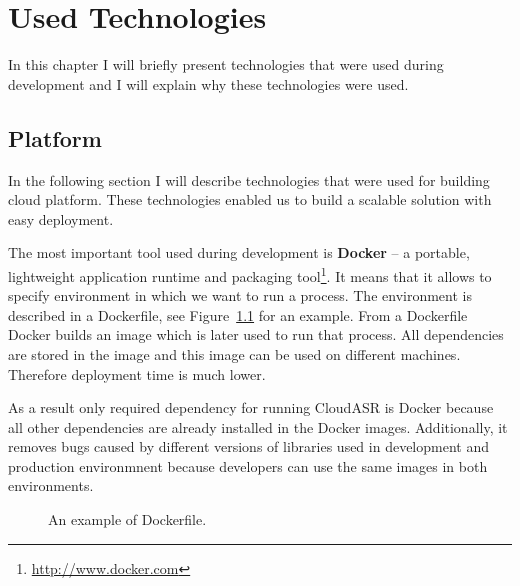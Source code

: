 \chapter{Used Technologies}\label{sec:technologies}
In this chapter I will briefly present technologies that were used during development
 and I will explain why these technologies were used.

\section{Platform}
In the following section I will describe technologies that were used for building cloud platform.
These technologies enabled us to build a scalable solution with easy deployment.


The most important tool used during development is \textbf{Docker}
  -- a portable, lightweight application runtime and packaging tool\footnote{
  \url{http://www.docker.com}
}.
It means that it allows to specify environment in which we want to run a process.
The environment is described in a Dockerfile,
  see Figure~\ref{fig:dockerfile} for an example.
From a Dockerfile Docker builds an image which is later used to run that process.
All dependencies are stored in the image and this image can be used on different machines.
Therefore deployment time is much lower.

As a result only required dependency for running CloudASR is Docker
  because all other dependencies are already installed in the Docker images.
Additionally, it removes bugs caused by different versions of libraries used in development and production environmnent
  because developers can use the same images in both environments.

\begin{figure}
  

  \label{fig:dockerfile}
  \caption{An example of Dockerfile.}
\end{figure}


